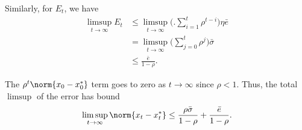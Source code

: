 \documentclass{homework}
\begin{document}
\begin{letterenum}
    Similarly, for $E_t$, we have
    \begin{align*}
        \limsup_{t\to\infty} E_t &\leq \limsup_{t\to\infty} \biggl(.
            \sum_{i=1}^t \rho^{t-i} 
        \biggr) \eta \bar{e} \\
        &= \limsup_{t\to\infty} \biggl(
            \sum_{j=0}^t \rho^{j} 
        \biggr) \bar{\sigma} \\
        &\leq \frac{\bar{e}}{1 - \rho}.
    \end{align*}

    The $\rho^t \norm{x_0 - x_0^*}$ term goes to zero as $t \to\infty$
    since $\rho < 1$. Thus, the total $\limsup$ of the error has bound
    \begin{equation*}
        \limsup_{t\to\infty} \norm{x_t - x_t^*} \leq
            \frac{\rho \bar{\sigma}}{1 - \rho} + 
            \frac{ \bar{e}}{1 - \rho}.
    \end{equation*}



\end{letterenum}
\end{document}
